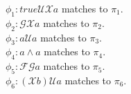 
$\phi_1: true\mathcal{UX}a$ matches to $\pi_1$.\\
$\phi_2: \mathcal{GX}a$ matches to $\pi_2$.\\
$\phi_3: a\mathcal{U}a$ matches to $\pi_3$.\\
$\phi_4: a\wedge a$ matches to $\pi_4$.\\
$\phi_5: \mathcal{FG}a$ matches to $\pi_5$.\\
$\phi_6: (\mathcal{X}b)\mathcal{U}a$ matches to $\pi_6$.